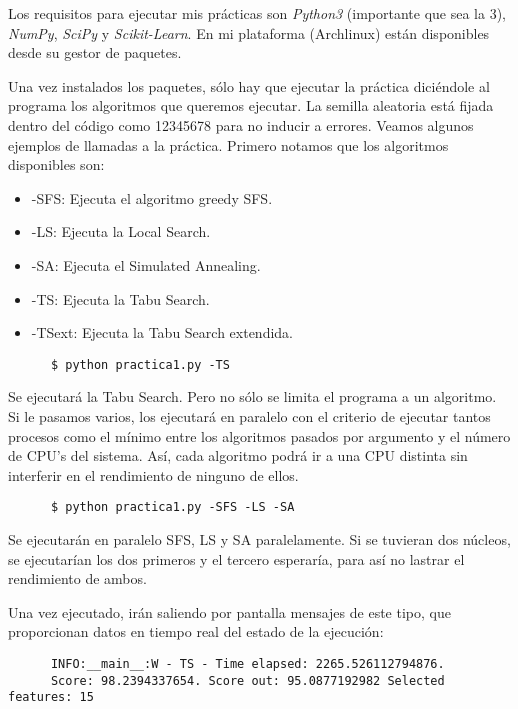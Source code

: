 \documentclass[a4paper, 11pt]{article}
\begin{document}
    Los requisitos para ejecutar mis prácticas son \emph{Python3} (importante que sea la 3), \emph{NumPy}, \emph{SciPy} y \emph{Scikit-Learn}. En mi plataforma (Archlinux) están disponibles desde su gestor de paquetes.

    Una vez instalados los paquetes, sólo hay que ejecutar la práctica diciéndole al programa los algoritmos que queremos ejecutar. La semilla aleatoria está fijada dentro del código como 12345678 para no inducir a errores. Veamos algunos ejemplos de llamadas a la práctica. Primero notamos que los algoritmos disponibles son:

    \begin{itemize}
      \item -SFS: Ejecuta el algoritmo greedy SFS.
      \item -LS: Ejecuta la Local Search.
      \item -SA: Ejecuta el Simulated Annealing.
      \item -TS: Ejecuta la Tabu Search.
      \item -TSext: Ejecuta la Tabu Search extendida.
    \end{itemize}

    \begin{verbatim}
      $ python practica1.py -TS
    \end{verbatim}
    Se ejecutará la Tabu Search. Pero no sólo se limita el programa a un algoritmo. Si le pasamos varios, los ejecutará en paralelo con el criterio de ejecutar tantos procesos como el mínimo entre los algoritmos pasados por argumento y el número de CPU's del sistema. Así, cada algoritmo podrá ir a una CPU distinta sin interferir en el rendimiento de ninguno de ellos.

    \begin{verbatim}
      $ python practica1.py -SFS -LS -SA
    \end{verbatim}
    Se ejecutarán en paralelo SFS, LS y SA paralelamente. Si se tuvieran dos núcleos, se ejecutarían los dos primeros y el tercero esperaría, para así no lastrar el rendimiento de ambos.

    Una vez ejecutado, irán saliendo por pantalla mensajes de este tipo, que proporcionan datos en tiempo real del estado de la ejecución:

    \begin{verbatim}
      INFO:__main__:W - TS - Time elapsed: 2265.526112794876.
      Score: 98.2394337654. Score out: 95.0877192982 Selected features: 15
    \end{verbatim}
\end{document}
